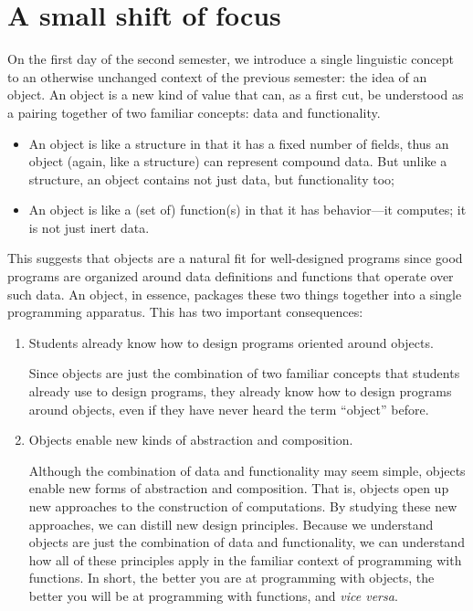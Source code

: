 \documentclass[submission,copyright]{eptcs}
\begin{document}
\section{A small shift of focus}
\label{sec:shift}

On the first day of the second semester, we introduce a single
linguistic concept to an otherwise unchanged context of the previous
semester: the idea of an object.
%
An object is a new kind of value that can, as a first cut, be
understood as a pairing together of two familiar concepts: data and
functionality.

\begin{itemize}
\item An object is like a structure in that it has a fixed number of
fields, thus an object (again, like a structure) can represent
compound data. But unlike a structure, an object contains not just
data, but functionality too;

\item An object is like a (set of) function(s) in that it has behavior---it computes; it is
not just inert data.
\end{itemize}

This suggests that objects are a natural fit for well-designed programs
since good programs are organized around data definitions and
functions that operate over such data. An object, in essence, packages
these two things together into a single programming apparatus. This
has two important consequences:

\begin{enumerate}

\item Students already know how to design programs oriented around objects.

Since objects are just the combination of two familiar concepts that
students already use to design programs, they already know how to
design programs around objects, even if they have never heard the term
``object'' before.

\item Objects enable new kinds of abstraction and composition.

Although the combination of data and functionality may seem simple,
objects enable new forms of abstraction and composition. That is,
objects open up new approaches to the construction of computations. By
studying these new approaches, we can distill new design
principles. Because we understand objects are just the combination of
data and functionality, we can understand how all of these principles
apply in the familiar context of programming with functions. In short,
the better you are at programming with objects, the better you will be
at programming with functions, and \emph{vice versa}.

\end{enumerate}
\end{document}
